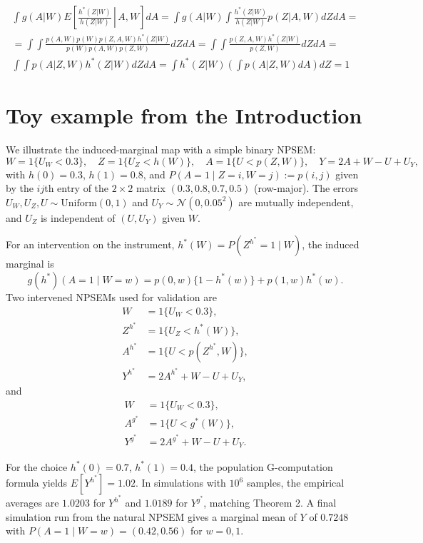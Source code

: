 \documentclass[12pt]{article}
\theoremstyle{thmstyleone}%
\theoremstyle{thmstyletwo}%
\theoremstyle{thmstylethree}%
\begin{document}
$$\begin{aligned}\int  g(A|W){E} \left[\left. \frac{h^*(Z|W)}{h(Z|W)} \,\right|\, A, W \right] dA = \int  g(A|W)\int  \frac{h^*(Z|W)}{h(Z|W)} p(Z|A,W)dZdA = \\ 
	= \int \int \frac{p(A,W)p(W)p(Z,A,W)h^*(Z|W)}{p(W)p(A,W)p(Z,W)} dZdA =\int \int \frac{p(Z,A,W)h^*(Z|W)}{p(Z,W)} dZdA = \\ \int \int {p(A|Z,W)h^*(Z|W)}dZdA = \int h^*(Z|W)\left(\int {p(A|Z,W)}dA\right)dZ = 1  \end{aligned}$$

\section{Toy example from the Introduction}

We illustrate the induced-marginal map with a simple binary NPSEM:
\[
W = 1 \{U_W < 0.3\},\quad
Z = 1 \{U_Z < h(W)\},\quad
A = 1 \{U < p(Z,W)\},\quad
Y = 2A + W - U + U_Y,
\]
with $h(0)=0.3$, $h(1)=0.8$, and $P(A=1\mid Z=i, W=j):=p(i,j)$ given by the $ij$th entry of the $2 \times 2$ matrix $(0.3,0.8,0.7,0.5)$ (row-major). The errors $U_W, U_Z, U \sim \mathrm{Uniform}(0,1)$ and $U_Y \sim \mathcal{N}(0,0.05^2)$ are mutually independent, and $U_Z$ is independent of $(U,U_Y)$ given $W$.

For an intervention on the instrument, $h^*(W) = P(Z^{h^*}=1\mid W)$, the induced marginal is
\[ g(h^*)(A=1\mid W=w) = p(0,w)\{1-h^*(w)\} + p(1,w)h^*(w). \]
Two intervened NPSEMs used for validation are
\begin{equation}
\begin{aligned}
W&  = 1 \{U_W < 0.3 \}, \\
Z^{h^*}&= 1 \{U_Z < h^*(W)\}, \\
A^{h^*} &= 1 \{U < p(Z^{h^*},W)\}, \\
Y^{h^*} &= 2A^{h^*} + W - U + U_Y,
\end{aligned}
\end{equation}
and
\begin{equation}
\begin{aligned}
W& = 1 \{U_W < 0.3 \}, \\
A^{g^*} &= 1 \{U < g^*(W)\}, \\
Y^{g^*} &= 2A^{g^*}  + W - U + U_Y.
\end{aligned}
\end{equation}

For the choice $h^*(0)=0.7$, $h^*(1)=0.4$, the population G-computation formula yields $E[Y^{h^*}] = 1.02$. In simulations with $10^6$ samples, the empirical averages are $1.0203$ for $Y^{h^*}$ and $1.0189$ for $Y^{g^*}$, matching Theorem 2. A final simulation run from the natural NPSEM gives a marginal mean of $Y$ of $0.7248$ with $P(A=1\mid W=w) = (0.42, 0.56)$ for $w=0,1$.
\end{document}
